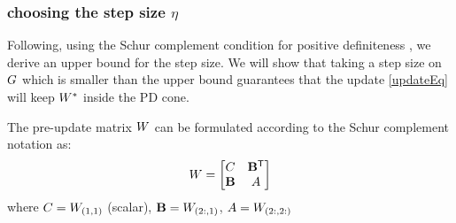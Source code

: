 \documentclass{article}
\begin{document}
\subsubsection{choosing the step size $\eta$}
Following, using the Schur complement condition for positive definiteness , we derive an upper bound for the step size. We will show that taking a step size on ${G}$ which is smaller than the upper bound guarantees that the update \eqref{updateEq} will keep ${{W^*}}$ inside the PD cone. 

The pre-update matrix ${W}$ can be formulated according to the Schur complement notation as: 
\begin{equation}
{W}= \left[ \begin{matrix} C & \mathbf{B{}^\mathsf{T}} \\ \mathbf{B} & {A} \end{matrix} \right]
\label{schurNotationPreUpdate}
\end{equation}
where $C = {W}_{(1,1)}$ (scalar), $\mathbf{B} = {W}_{(2:,1)}$, ${A} = {W}_{(2:,2:)}$
\end{document}
